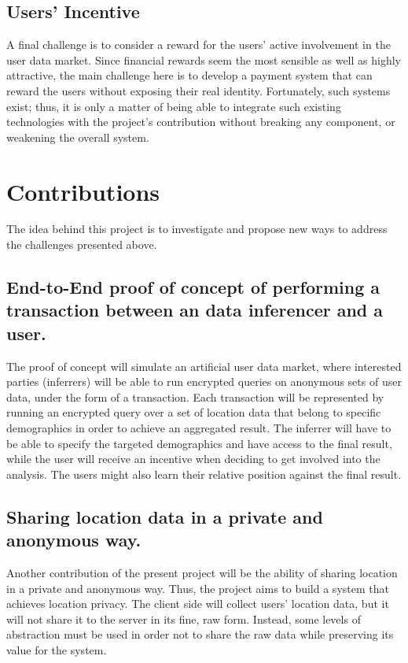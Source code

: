 \subsection{Users' Incentive}
A final challenge is to consider a reward for the users' active involvement in the user data market. Since financial rewards seem the most sensible as well as highly attractive, the main challenge here is to develop a payment system that can reward the users without exposing their real identity. Fortunately, such systems exist; thus, it is only a matter of being able to integrate such existing technologies with the project's contribution without breaking any component, or weakening the overall system.

\section{Contributions}

The idea behind this project is to investigate and propose new ways to address the challenges presented above.
\subsection{End-to-End proof of concept of performing a transaction between an data inferencer and a user.}

The proof of concept will simulate an artificial user data market, where interested parties (inferrers) will be able to run encrypted queries on anonymous sets of user data, under the form of a transaction. Each transaction will be represented by running an encrypted query over a set of location data that belong to specific demographics in order to achieve an aggregated result. The inferrer will have to be able to specify the targeted demographics and have access to the final result, while the user will receive an incentive when deciding to get involved into the analysis. The users might also learn their relative position against the final result.

\subsection{Sharing location data in a private and anonymous way.}
Another contribution of the present project will be the ability of sharing location in a private and anonymous way. Thus, the project aims to build a system that achieves location privacy. The client side will collect users' location data, but it will not share it to the server in its fine, raw form. Instead, some levels of abstraction must be used in order not to share the raw data while preserving its value for the system.

